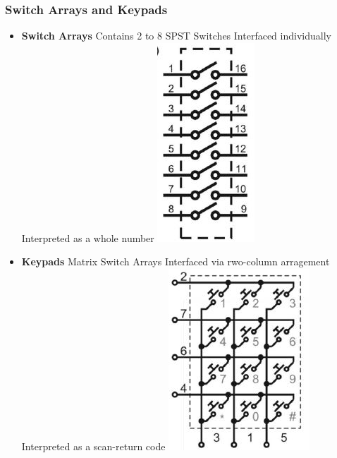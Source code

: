\subsubsection{Switch Arrays and Keypads}
\begin{multicols}{2}
	\begin{itemize}
		\item \textbf{Switch Arrays}
		\subitem Contains 2 to 8 SPST Switches
		\subitem Interfaced individually
		\subitem Interpreted as a whole number\newline
		\includegraphics[width=0.3\linewidth]{images/Switch_Array.jpg}  
		\item \textbf{Keypads}
		\subitem Matrix Switch Arrays
		\subitem Interfaced via rwo-column arragement
		\subitem Interpreted as a scan-return code \newline
		\includegraphics[width=0.5\linewidth]{images/Keypad.jpg}
	\end{itemize}
\end{multicols}
